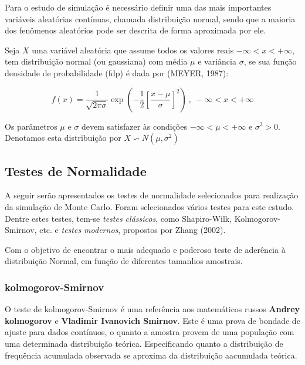 \documentclass[a4paper,11pt]{article} %
\begin{document}
Para o estudo de simulação é necessário definir uma das mais importantes  variáveis aleatórias contínuas, chamada distribuição normal, sendo que a maioria dos fenômenos aleatórios pode ser descrita de forma aproximada por ele.\vskip0.3cm

Seja $X$ uma variável aleatória que assume todos os valores reais $- \infty < x < +\infty$, tem distribuição normal (ou gaussiana) com média $\mu$ e  variância $\sigma$, se sua função densidade de probabilidade (fdp) é dada por (MEYER, 1987):

\begin{equation}
f(x) = \frac{1}{\sqrt{2 \pi \sigma}} \exp \left(-\frac{1}{2} \left[\frac{x- \mu}{\sigma} \right]^{2} \right) \ , \ - \infty < x < +\infty
\end{equation}

Os parâmetros  $\mu$ e $\sigma$ devem satisfazer às condições  $-\infty < \mu < +\infty$ e $\sigma^{2} > 0$. Denotamos esta distribuição por $X \backsim N(\mu, \sigma^{2})$



\subsection{Testes de Normalidade} \label{section:tests_norm}

A seguir serão apresentados os testes de normalidade selecionados para realização da simulação de Monte Carlo. Foram selecionados vários testes para este estudo. Dentre estes testes, tem-se \textit{testes clássicos}, como Shapiro-Wilk, Kolmogorov-Smirnov, etc. e \textit{testes modernos}, propostos por Zhang (2002).\vskip0.3cm

Com o objetivo de encontrar o mais adequado e poderoso teste de aderência à distribuição Normal, em função de diferentes tamanhos amostrais.

\subsubsection{kolmogorov-Smirnov}

O teste de kolmogorov-Smirnov é uma referência aos matemáticos russos \textbf{Andrey kolmogorov} e \textbf{Vladimir Ivanovich Smirnov}. Este é uma prova de bondade de ajuste para dados contínuos, o quanto a amostra provem de uma população com uma determinada distribuição teórica. Especificando quanto a distribuição de frequência acumulada observada se aproxima da distribuição aacumulada teórica.\vskip0.3cm
\end{document}

